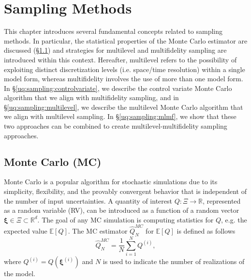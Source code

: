 \chapter{Sampling Methods}\label{uq:sampling}


This chapter introduces several fundamental concepts related to
sampling methods. In particular, the statistical properties of the
Monte Carlo estimator are discussed
(\S\ref{uq:sampling:montecarlo}) and strategies for multilevel and
multifidelity sampling are introduced within this context. Hereafter,
multilevel refers to the possibility of exploiting distinct
discretization levels (i.e. space/time resolution) within a single
model form, whereas multifidelity involves the use of more than one
model form.  In \S\ref{uq:sampling:controlvariate}, we describe the
control variate Monte Carlo algorithm that we align with multifidelity
sampling, and in \S\ref{uq:sampling:multilevel}, we describe the
multilevel Monte Carlo algorithm that we align with multilevel
sampling.  In \S\ref{uq:sampling:mlmf}, we show that these two
approaches can be combined to create multilevel-multifidelity sampling
approaches.

\section{Monte Carlo (MC)} \label{uq:sampling:montecarlo}
Monte Carlo is a popular algorithm for stochastic simulations due to its simplicity, flexibility, and the provably convergent behavior that is independent 
of the number of input uncertainties. A quantity of interest $Q: \Xi \rightarrow \mathbb{R}$, represented as a random variable (RV), 
can be introduced as a function of a random vector $\boldsymbol{\xi} \in \Xi \subset \mathbb{R}^d$. The goal of any MC simulation is computing 
statistics for $Q$, e.g. the expected value $\mathbb{E}\left[Q\right]$. The MC estimator $\hat{Q}_N^{MC}$ for 
$\mathbb{E}\left[Q\right]$ is defined as follows
\begin{equation}
\hat{Q}_N^{MC} = \dfrac{1}{N} \sum_{i=1}^N Q^{(i)},
\end{equation}
where $Q^{(i)} = Q(\boldsymbol{\xi}^{(i)})$ and $N$ is used to indicate the number of realizations of the model. 

